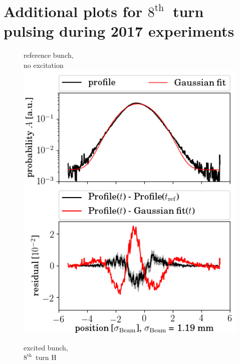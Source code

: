 \documentclass[%
 reprint,
 amsmath,amssymb,
 aps,
prstab,
]{revtex4-1}
\begin{document}
\section{Additional plots for $8^{\mathrm{th}}$~turn pulsing during 2017 experiments}
\label{app:sec:8}
\begin{figure}[h]
	\begin{minipage}[t]{0.49\linewidth}
		\centering
		reference bunch,\\ no excitation
		\includegraphics[width=1.0\linewidth]{profile_h_8thh_slot_804.png}
	\end{minipage}
	\begin{minipage}[t]{0.49\linewidth}
		\centering
		excited bunch,\\ $8^{\mathrm{th}}$~turn H

\end{minipage}
\end{figure}
\end{document}
